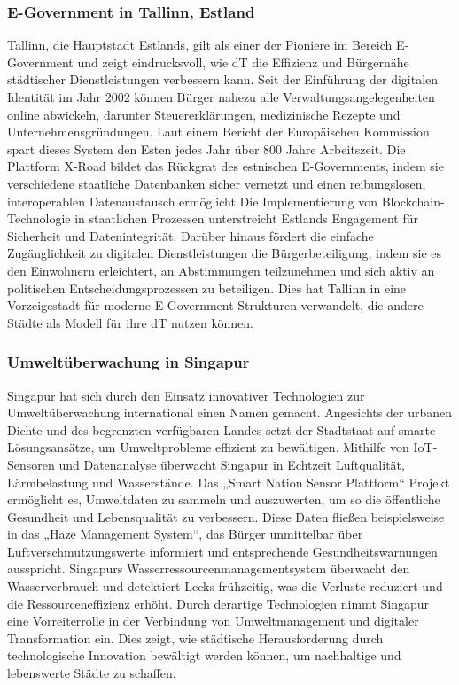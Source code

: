 \documentclass[conference,compsoc,final,a4paper, onecolumn, 11pt]{IEEEtran}
\begin{document}
\subsubsection{E-Government in Tallinn, Estland}
Tallinn, die Hauptstadt Estlands, gilt als einer der Pioniere im Bereich E-Government und zeigt eindrucksvoll, wie \ac{dT} die Effizienz und Bürgernähe städtischer Dienstleistungen verbessern kann. 
Seit der Einführung der digitalen Identität im Jahr 2002 können Bürger nahezu alle Verwaltungsangelegenheiten online abwickeln, darunter Steuererklärungen, medizinische Rezepte und Unternehmensgründungen. 
Laut einem Bericht der Europäischen Kommission spart dieses System den Esten jedes Jahr über 800 Jahre Arbeitszeit. \autocite{noauthor_estonia_2021}
Die Plattform X-Road bildet das Rückgrat des estnischen E-Governments, indem sie verschiedene staatliche Datenbanken sicher vernetzt und einen reibungslosen, interoperablen Datenaustausch ermöglicht \autocite{noauthor_estonia_nodate}
Die Implementierung von Blockchain-Technologie in staatlichen Prozessen unterstreicht Estlands Engagement für Sicherheit und Datenintegrität. \autocite{noauthor_estonia_2021}
Darüber hinaus fördert die einfache Zugänglichkeit zu digitalen Dienstleistungen die Bürgerbeteiligung, indem sie es den Einwohnern erleichtert, an Abstimmungen teilzunehmen und sich aktiv an politischen Entscheidungsprozessen zu beteiligen. 
Dies hat Tallinn in eine Vorzeigestadt für moderne E-Government-Strukturen verwandelt, die andere Städte als Modell für ihre \ac{dT} nutzen können.


\subsubsection{Umweltüberwachung in Singapur}
Singapur hat sich durch den Einsatz innovativer Technologien zur Umweltüberwachung international einen Namen gemacht. 
Angesichts der urbanen Dichte und des begrenzten verfügbaren Landes setzt der Stadtstaat auf smarte Lösungsansätze, um Umweltprobleme effizient zu bewältigen. 
Mithilfe von \ac{IoT}-Sensoren und Datenanalyse überwacht Singapur in Echtzeit Luftqualität, Lärmbelastung und Wasserstände. \autocite{noauthor_smart_nodate-1}
Das „Smart Nation Sensor Plattform“ Projekt ermöglicht es, Umweltdaten zu sammeln und auszuwerten, um so die öffentliche Gesundheit und Lebensqualität zu verbessern. 
Diese Daten fließen beispielsweise in das „Haze Management System“, das Bürger unmittelbar über Luftverschmutzungswerte informiert und entsprechende Gesundheitswarnungen ausspricht. \autocite{noauthor_smart_nodate-1}
Singapurs Wasserressourcenmanagementsystem überwacht den Wasserverbrauch und detektiert Lecks frühzeitig, was die Verluste reduziert und die Ressourceneffizienz erhöht. \autocite{noauthor_smart_nodate-1}
Durch derartige Technologien nimmt Singapur eine Vorreiterrolle in der Verbindung von Umweltmanagement und digitaler Transformation ein. 
Dies zeigt, wie städtische Herausforderung durch technologische Innovation bewältigt werden können, um nachhaltige und lebenswerte Städte zu schaffen.
\end{document}
